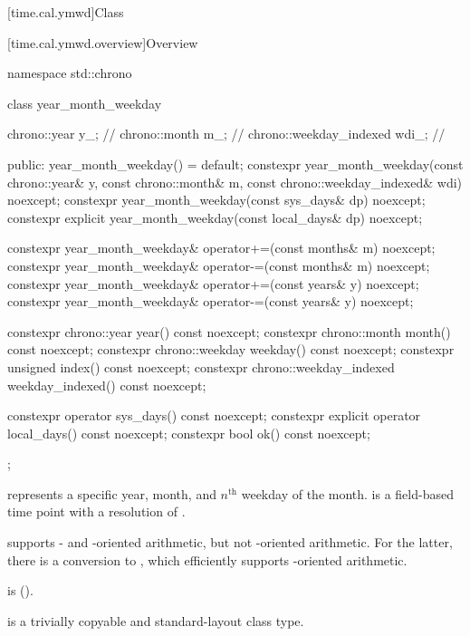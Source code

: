 [time.cal.ymwd]{Class }

[time.cal.ymwd.overview]{Overview}

\begin{codeblock}
namespace std::chrono {
  class year_month_weekday {
    chrono::year            y_;         // \expos
    chrono::month           m_;         // \expos
    chrono::weekday_indexed wdi_;       // \expos

  public:
    year_month_weekday() = default;
    constexpr year_month_weekday(const chrono::year& y, const chrono::month& m,
                                 const chrono::weekday_indexed& wdi) noexcept;
    constexpr year_month_weekday(const sys_days& dp) noexcept;
    constexpr explicit year_month_weekday(const local_days& dp) noexcept;

    constexpr year_month_weekday& operator+=(const months& m) noexcept;
    constexpr year_month_weekday& operator-=(const months& m) noexcept;
    constexpr year_month_weekday& operator+=(const years& y)  noexcept;
    constexpr year_month_weekday& operator-=(const years& y)  noexcept;

    constexpr chrono::year            year()            const noexcept;
    constexpr chrono::month           month()           const noexcept;
    constexpr chrono::weekday         weekday()         const noexcept;
    constexpr unsigned                index()           const noexcept;
    constexpr chrono::weekday_indexed weekday_indexed() const noexcept;

    constexpr          operator sys_days()   const noexcept;
    constexpr explicit operator local_days() const noexcept;
    constexpr bool ok() const noexcept;
  };
}
\end{codeblock}

\pnum
{} represents a specific year, month,
and $n^\text{th}$ weekday of the month.
 is a field-based time point with a resolution of .
\begin{note}
 supports - and -oriented arithmetic,
but not -oriented arithmetic.
For the latter, there is a conversion to ,
which efficiently supports -oriented arithmetic.
\end{note}
 is  ().

\pnum
{} is a trivially copyable and standard-layout class type.

